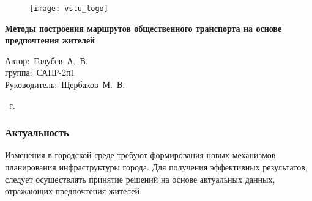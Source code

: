 \begin{frame}
    \begin{figure}
        \hspace*{-320pt}\texttt{[image: vstu\_logo]}
    \end{figure}
    \vspace{2em}
    \begin{center}
        \large
        \textbf{Методы построения маршрутов общественного транспорта на основе предпочтения жителей}\\
    \end{center}
    \vspace{2em}
    \begin{flushleft}
        \hspace{12em}Автор:~Голубев~А.~В.\\
        \hspace{12em}группа:~САПР-2п1\\
        \hspace{12em}Руководитель:~Щербаков~М.~В.
    \end{flushleft}
    \vspace{3em}
     \the\year\ г.
\end{frame}

\begin{frame}
    \frametitle{Актуальность}
    Изменения в городской среде требуют формирования новых механизмов планирования инфраструктуры города. 
    Для получения эффективных результатов, следует осуществлять принятие решений на основе актуальных 
    данных, отражающих предпочтения жителей.
\end{frame}

